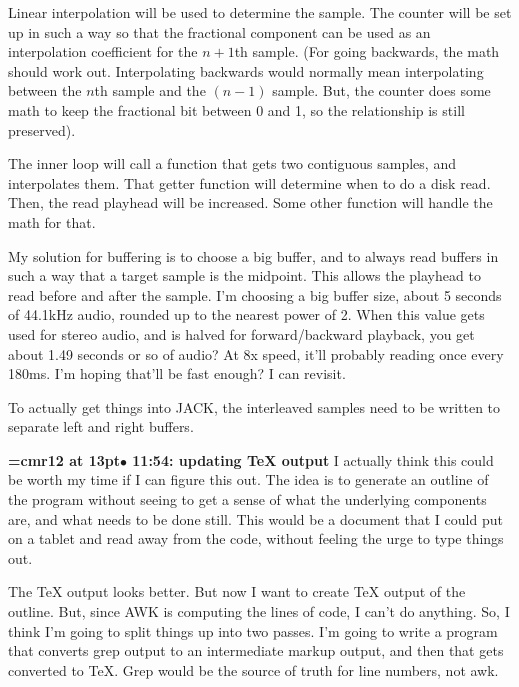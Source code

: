 Linear interpolation will be used to determine the sample. The counter will be set up in such a way so that the fractional component can be used as an interpolation coefficient for the $n + 1$th sample. (For going backwards, the math should work out. Interpolating backwards would normally mean interpolating between the $n$th sample and the $(n - 1)$ sample. But, the counter does some math to keep the fractional bit between 0 and 1, so the relationship is still preserved).
\par

The inner loop will call a function that gets two contiguous samples, and interpolates them. That getter function will determine when to do a disk read. Then, the read playhead will be increased. Some other function will handle the math for that.
\par

My solution for buffering is to choose a big buffer, and to always read buffers in such a way that a target sample is the midpoint. This allows the playhead to read before and after the sample. I'm choosing a big buffer size, about 5 seconds of 44.1kHz audio, rounded up to the nearest power of 2. When this value gets used for stereo audio, and is halved for forward/backward playback, you get about 1.49 seconds or so of audio? At 8x speed, it'll probably reading once every 180ms. I'm hoping that'll be fast enough? I can revisit.
\par

To actually get things into JACK, the interleaved samples need to be written to separate left and right buffers.
\par

{\smallskip\noindent\bf\font\titlefont=cmr12 at 13pt\titlefont $\bullet$ 11:54: updating TeX output}\smallskip
I actually think this could be worth my time if I can figure this out. The idea is to generate an outline of the program without seeing to get a sense of what the underlying components are, and what needs to be done still. This would be a document that I could put on a tablet and read away from the code, without feeling the urge to type things out.
\par

The TeX output looks better. But now I want to create TeX output of the outline. But, since AWK is computing the lines of code, I can't do anything. So, I think I'm going to split things up into two passes. I'm going to write a program that converts grep output to an intermediate markup output, and then that gets converted to TeX. Grep would be the source of truth for line numbers, not awk.
\par

